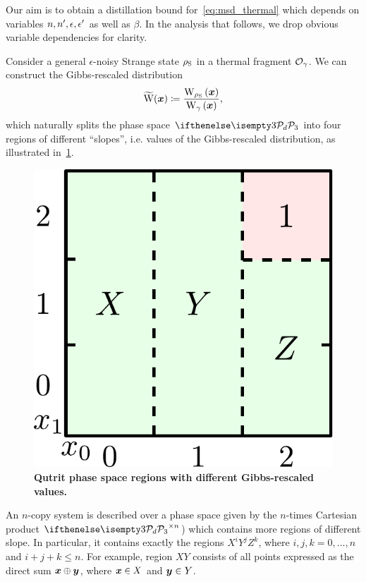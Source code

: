 \documentclass[pra,
aps,
twocolumn,
superscriptaddress,
groupedaddress,
nofootinbib,
reprint
]{revtex4-1}
\begin{document}
Our aim is to obtain a distillation bound for~\cref{eq:msd_thermal} which depends on variables $n, n', \epsilon, \epsilon'$ as well as $\beta$.
In the analysis that follows, we drop obvious variable dependencies for clarity.

Consider a general $\epsilon$-noisy Strange state $\rho_{\rm{S}}$ in a thermal fragment $\mathcal{O}_{\gamma}$.
We can construct the Gibbs-rescaled distribution 
\begin{equation}
	\widetilde{\rm{W}}(\bmx) \coloneqq \frac{\W[\bmx]{\noisys}}{\W[\bmx]{\gamma}},
\end{equation}
which naturally splits the phase space $\pd[3]$ into four regions of different ``slopes'', i.e. values of the Gibbs-rescaled distribution, as illustrated in~\cref{fig:pd_split_thermal}.
\begin{figure}[h]
    \centering
    \includegraphics[scale=0.5]{figs/pd_split_thermal.pdf}
    \caption{\textbf{Qutrit phase space regions with different Gibbs-rescaled values.}
    }
    \label{fig:pd_split_thermal}
\end{figure}

An $n$-copy system is described over a phase space given by the $n$-times Cartesian product $\pd[3]^{\times n}$) which contains more regions of different slope.
In particular, it contains exactly the regions $X^i Y^j Z^k$, where $i,j,k = 0,\dots,n$ and $i+j+k \leq n$. 
For example, region $XY$ consists of all points expressed as the direct sum $\bm{x} \oplus \bm{y}$, where $\bm{x} \in X$ and $\bm{y} \in Y$.
\end{document}
